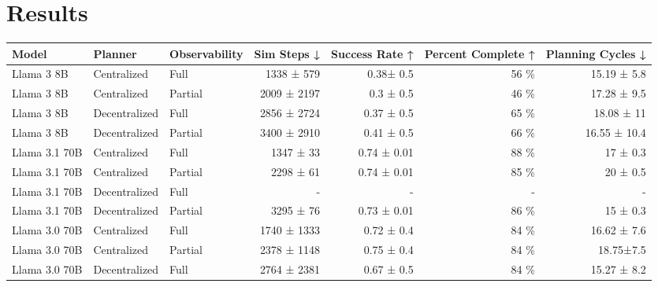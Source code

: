 \section{Results}

\begin{table*}[h]
    \centering
    \begin{tabular}{lllrrrr}
        \toprule
        Model              & Planner       & Observability & Sim Steps ↓ & Success Rate ↑      & Percent Complete ↑ & Planning Cycles ↓
        \\
        \midrule
        Llama 3 8B         & Centralized   & Full          & 1338 ± 579  & 0.38± 0.5           & 56 \%              & 15.19 ± 5.8       \\
        Llama 3 8B         & Centralized   & Partial       & 2009 ± 2197 & 0.3 ± 0.5           & 46 \%              & 17.28 ± 9.5       \\
        Llama 3 8B         & Decentralized & Full          & 2856 ± 2724 & 0.37 ± 0.5          & 65 \%              & 18.08 ± 11        \\
        Llama 3 8B         & Decentralized & Partial       & 3400 ± 2910 & 0.41 ± 0.5          & 66 \%              & 16.55 ± 10.4      \\
        \midrule
        Llama 3.1 70B      & Centralized   & Full          & 1347 ± 33   & 0.74 ± 0.01         & 88 \%              & 17 ± 0.3          \\
        Llama 3.1 70B      & Centralized   & Partial       & 2298 ± 61   & 0.74 ± 0.01         & 85 \%              & 20 ± 0.5          \\
        Llama 3.1 70B      & Decentralized & Full          & -           & -                   & -                  & -                 \\
        Llama 3.1 70B      & Decentralized & Partial       & 3295 ± 76   & 0.73 ± 0.01         & 86 \%              & 15 ± 0.3          \\
        \midrule
        Llama 3.0 70B      & Centralized   & Full          & 1740 ± 1333 & 0.72 ± 0.4          & 84 \%              & 16.62 ± 7.6       \\
        Llama 3.0 70B      & Centralized   & Partial       & 2378 ± 1148 & 0.75 ± 0.4          & 84 \%              & 18.75±7.5         \\
        Llama 3.0 70B      & Decentralized & Full          & 2764 ± 2381 & 0.67 ± 0.5          & 84 \%              & 15.27 ± 8.2       \\

\end{tabular}
\end{table*}
